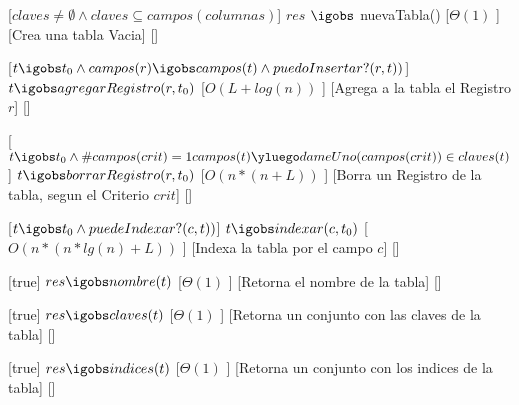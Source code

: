 \begin{Interfaz}
  


  
  

  [$claves \neq \emptyset \land claves  \subseteq campos(columnas)$] %
  {$res$ $\igobs$ nuevaTabla()} %
  [$\Theta(1)$ ] %
  [Crea una tabla Vacia] %
  [] %
  
  [$t \igobs t_0 \land campos(r) \igobs campos(t) \wedge puedoInsertar?(r,t))$] %
  {$t \igobs agregarRegistro(r,t_0)$} %
  [$O(L + log(n))$ ] %
  [Agrega a la tabla el Registro $r$] %
  [] %
  
  [$t \igobs t_0 \land \#campos(crit) = 1 campos(t) \yluego dameUno(campos(crit)) \in claves(t)$] %
  {$t \igobs borrarRegistro(r,t_0)$} %
  [$O(n*(n+L))$ ] %
  [Borra un Registro de la tabla, segun el Criterio $crit$] %
  [] %
  
  [$t \igobs t_0 \land puedeIndexar?(c,t))$] %
  {$t \igobs indexar(c,t_0)$} %
  [$O(n * (n * lg(n) + L))$ ] %
  [Indexa la tabla por el campo $c$] %
  [] %
  
  [true] %
  {$res \igobs nombre(t)$} %
  [$\Theta(1)$ ] %
  [Retorna el nombre de la tabla] %
  [] %
  
  [true] %
  {$res \igobs claves(t)$} %
  [$\Theta(1)$ ] %
  [Retorna un conjunto con las claves de la tabla] %
  [] %
  
\newpage
  
  [true] %
  {$res \igobs indices(t)$} %
  [$\Theta(1)$ ] %
  [Retorna un conjunto con los indices de la tabla] %
  [] %
  

\end{Interfaz}
